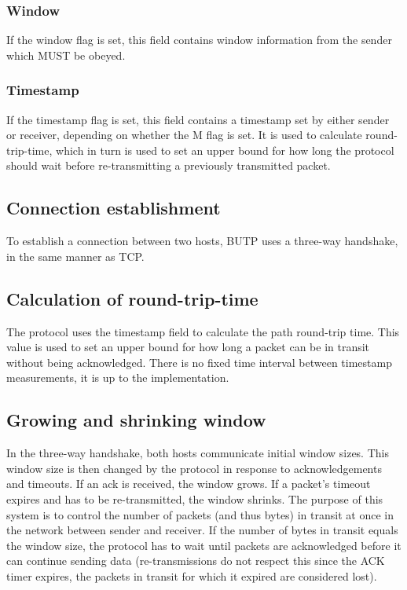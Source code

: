 \documentclass{article}
\begin{document}
\subsubsection{Window}
If the window flag is set, this field contains window information from the sender which MUST be obeyed.

\subsubsection{Timestamp}
If the timestamp flag is set, this field contains a timestamp set by either sender or receiver, depending on whether the M flag is set. It is used to calculate round-trip-time, which in turn is used to set an upper bound for how long the protocol should wait before re-transmitting a previously transmitted packet.

\subsection{Connection establishment}
To establish a connection between two hosts, BUTP uses a three-way handshake, in the same manner as TCP.

\subsection{Calculation of round-trip-time}
The protocol uses the timestamp field to calculate the path round-trip time. This value is used to set an upper bound for how long a packet can be in transit without being acknowledged. There is no fixed time interval between timestamp measurements, it is up to the implementation.

\subsection{Growing and shrinking window}
In the three-way handshake, both hosts communicate initial window sizes. This window size is then changed by the protocol in response to acknowledgements and timeouts. If an ack is received, the window grows. If a packet's timeout expires and has to be re-transmitted, the window shrinks. The purpose of this system is to control the number of packets (and thus bytes) in transit at once in the network between sender and receiver. If the number of bytes in transit equals the window size, the protocol has to wait until packets are acknowledged before it can continue sending data (re-transmissions do not respect this since the ACK timer expires, the packets in transit for which it expired are considered lost).
\end{document}
